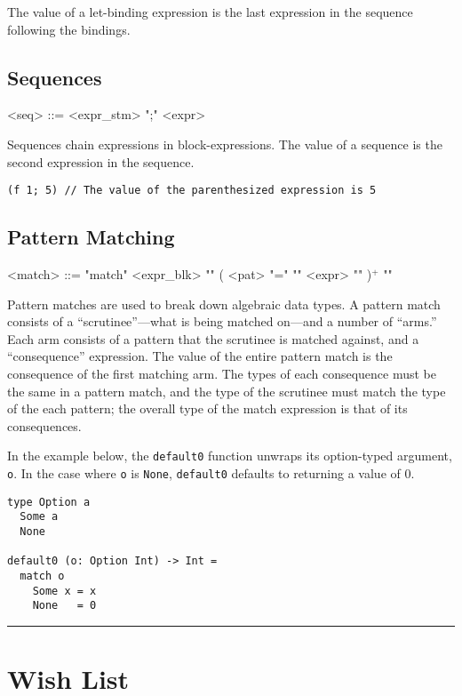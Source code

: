 \documentclass{article}
\begin{document}
The value of a let-binding expression is the last expression in the sequence following the bindings.
\subsection{Sequences}
\begin{grammar}
<seq> ::= <expr_stm> ";" <expr>
\end{grammar}
Sequences chain expressions in block-expressions. The value of a sequence is the second expression in the sequence.
\begin{lstlisting}
(f 1; 5) // The value of the parenthesized expression is 5
\end{lstlisting}


\subsection{Pattern Matching}
\begin{grammar}
<match> ::=  "match" <expr_blk> "{" (  <pat> "=" "{" <expr> "}" )$^{+}$ "}"
\end{grammar}

Pattern matches are used to break down algebraic data types.
A pattern match consists of a ``scrutinee''---what is being matched on---and a number of ``arms.''
Each arm consists of a pattern that the scrutinee is matched against, and a ``consequence'' expression.
The value of the entire pattern match is the consequence of the first matching arm.
The types of each consequence must be the same in a pattern match, and the type of the scrutinee must match the type of the each pattern; the overall type of the match expression is that of its consequences.

In the example below, the \texttt{default0} function unwraps its option-typed argument, \texttt{o}.
In the case where \texttt{o} is \texttt{None}, \texttt{default0} defaults to returning a value of 0.

\begin{lstlisting}
type Option a
  Some a
  None

default0 (o: Option Int) -> Int =
  match o
    Some x = x
    None   = 0
\end{lstlisting}

\newpage

\hrule

\section{Wish List}
\end{document}
